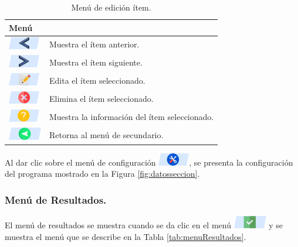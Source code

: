 \documentclass[spanish,xcolor=pdftex,dvipsnames,table,mathserif]{scrartcl}
\begin{document}
\begin{table}[H]
	\caption{Menú de edición ítem.}
	\label{tab:menuEdicionItem}
	\begin{tabular}{>{\centering}m{2cm}>{\raggedright}m{14cm}}
		\toprule 
		\textbf{Menú} & \multicolumn{1}{c}{\textbf{Descripción}} \tabularnewline
		\midrule 
		\includegraphics{imagenes/men_anterior}
		& Muestra el ítem anterior.\tabularnewline
		\cmidrule(lr){1-2}
		\includegraphics{imagenes/men_siguiente} & Muestra el ítem siguiente.\tabularnewline
		\cmidrule(lr){1-2}
		\includegraphics{imagenes/men_editar}& Edita el ítem seleccionado.\tabularnewline
		\cmidrule(lr){1-2}
		\includegraphics{imagenes/men_eliminar_dato}& Elimina el ítem seleccionado.\tabularnewline
		\cmidrule(lr){1-2}
		\includegraphics{imagenes/men_info_figura}& Muestra la información del ítem seleccionado.\tabularnewline
		\cmidrule(lr){1-2}
		\includegraphics{imagenes/men_volver}& Retorna al menú de secundario.\tabularnewline
		\bottomrule
	\end{tabular}
\end{table}

Al dar clic sobre el menú de configuración \includegraphics{imagenes/men_cfg}, se presenta la configuración del programa mostrado en la Figura \ref{fig:datosseccion}.

\subsubsection{Menú de Resultados.}
El menú de resultados se muestra cuando se da clic en el menú \includegraphics{imagenes/men_aceptar} y se muestra el menú que se describe en la Tabla \ref{tab:menuResultados}.
\end{document}
